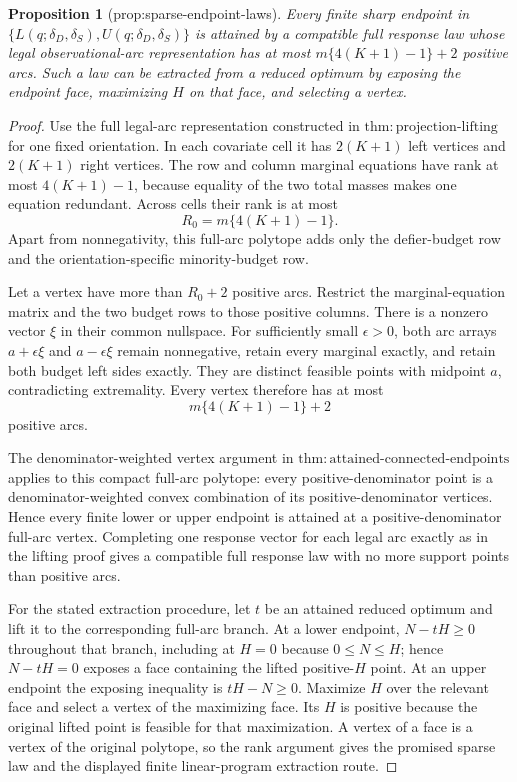 \documentclass{article}
\newtheorem{proposition}{Proposition}
\begin{document}
\begin{proposition}[prop:sparse-endpoint-laws]\label{prop:sparse-endpoint-laws}
Every finite sharp endpoint in \(\{L(q;\delta_D,\delta_S),U(q;\delta_D,\delta_S)\}\) is attained by a compatible full response law whose legal observational-arc representation has at most \(m\{4(K+1)-1\}+2\) positive arcs. Such a law can be extracted from a reduced optimum by exposing the endpoint face, maximizing \(H\) on that face, and selecting a vertex.
\end{proposition}
\begin{proof}
Use the full legal-arc representation constructed in \(\mathrm{thm:projection\text{-}lifting}\) for one fixed orientation. In each covariate cell it has \(2(K+1)\) left vertices and \(2(K+1)\) right vertices. The row and column marginal equations have rank at most \(4(K+1)-1\), because equality of the two total masses makes one equation redundant. Across cells their rank is at most
\[
 R_0=m\{4(K+1)-1\}.
\]
Apart from nonnegativity, this full-arc polytope adds only the defier-budget row and the orientation-specific minority-budget row.

Let a vertex have more than \(R_0+2\) positive arcs. Restrict the marginal-equation matrix and the two budget rows to those positive columns. There is a nonzero vector \(\xi\) in their common nullspace. For sufficiently small \(\epsilon>0\), both arc arrays \(a+\epsilon\xi\) and \(a-\epsilon\xi\) remain nonnegative, retain every marginal exactly, and retain both budget left sides exactly. They are distinct feasible points with midpoint \(a\), contradicting extremality. Every vertex therefore has at most
\[
 m\{4(K+1)-1\}+2
\]
positive arcs.

The denominator-weighted vertex argument in \(\mathrm{thm:attained\text{-}connected\text{-}endpoints}\) applies to this compact full-arc polytope: every positive-denominator point is a denominator-weighted convex combination of its positive-denominator vertices. Hence every finite lower or upper endpoint is attained at a positive-denominator full-arc vertex. Completing one response vector for each legal arc exactly as in the lifting proof gives a compatible full response law with no more support points than positive arcs.

For the stated extraction procedure, let \(t\) be an attained reduced optimum and lift it to the corresponding full-arc branch. At a lower endpoint, \(N-tH\geq0\) throughout that branch, including at \(H=0\) because \(0\leq N\leq H\); hence \(N-tH=0\) exposes a face containing the lifted positive-\(H\) point. At an upper endpoint the exposing inequality is \(tH-N\geq0\). Maximize \(H\) over the relevant face and select a vertex of the maximizing face. Its \(H\) is positive because the original lifted point is feasible for that maximization. A vertex of a face is a vertex of the original polytope, so the rank argument gives the promised sparse law and the displayed finite linear-program extraction route.
\end{proof}
\end{document}
